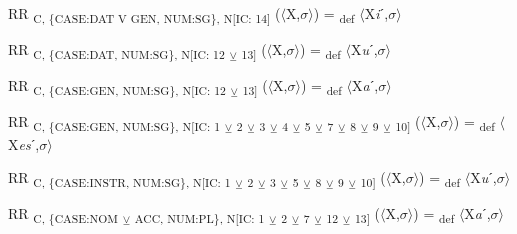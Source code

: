 {\begin{exe}
 RR \textsubscript{C, \{CASE:DAT V GEN, NUM:SG\}, N[IC: 14]} ($\langle$X,$\sigma $$\rangle$) = \textsubscript{def} $\langle$X\textit{i}ˊ,$\sigma $$\rangle$
\end{exe}

\begin{exe}
 RR \textsubscript{C, \{CASE:DAT, NUM:SG\}, N[IC: 12} \textsubscript{${\veebar}$}\textsubscript{ 13]} ($\langle$X,$\sigma $$\rangle$) = \textsubscript{def} $\langle$X\textit{u}ˊ,$\sigma $$\rangle$
\end{exe}

\begin{exe}
 RR \textsubscript{C, \{CASE:GEN, NUM:SG\}, N[IC: 12} \textsubscript{${\veebar}$}\textsubscript{ 13]} ($\langle$X,$\sigma $$\rangle$) = \textsubscript{def} $\langle$X\textit{a}ˊ,$\sigma $$\rangle$
\end{exe}

\begin{exe}
 RR \textsubscript{C, \{CASE:GEN, NUM:SG\}, N[IC: 1} \textsubscript{${\veebar}$}\textsubscript{ 2} \textsubscript{${\veebar}$}\textsubscript{ 3} \textsubscript{${\veebar}$}\textsubscript{ 4} \textsubscript{${\veebar}$}\textsubscript{ 5} \textsubscript{${\veebar}$}\textsubscript{ 7} \textsubscript{${\veebar}$}\textsubscript{ 8} \textsubscript{${\veebar}$}\textsubscript{ 9} \textsubscript{${\veebar}$}\textsubscript{ 10]} ($\langle$X,$\sigma $$\rangle$) = \textsubscript{def} $\langle$X\textit{es}ˊ,$\sigma $$\rangle$
\end{exe}

\begin{exe}
 RR \textsubscript{C, \{CASE:INSTR, NUM:SG\}, N[IC: 1} \textsubscript{${\veebar}$}\textsubscript{ 2} \textsubscript{${\veebar}$}\textsubscript{ 3} \textsubscript{${\veebar}$}\textsubscript{ 5} \textsubscript{${\veebar}$}\textsubscript{ 8} \textsubscript{${\veebar}$}\textsubscript{ 9} \textsubscript{${\veebar}$}\textsubscript{ 10]} ($\langle$X,$\sigma $$\rangle$) = \textsubscript{def} $\langle$X\textit{u}ˊ,$\sigma $$\rangle$
\end{exe}

\begin{exe}
 RR \textsubscript{C, \{CASE:NOM} \textsubscript{${\veebar}$}\textsubscript{ ACC, NUM:PL\}, N[IC: 1} \textsubscript{${\veebar}$}\textsubscript{ 2} \textsubscript{${\veebar}$}\textsubscript{ 7} \textsubscript{${\veebar}$}\textsubscript{ 12} \textsubscript{${\veebar}$}\textsubscript{ 13]} ($\langle$X,$\sigma $$\rangle$) = \textsubscript{def} $\langle$X\textit{a}ˊ,$\sigma $$\rangle$
\end{exe}

}
